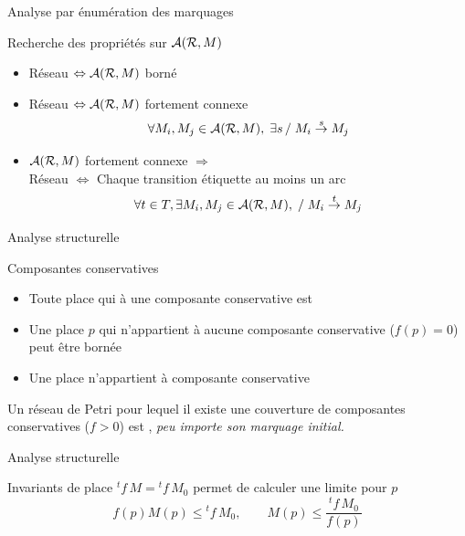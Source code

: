\documentclass[compress]{beamer}
\begin{document}
\begin{frame}{Analyse par énumération des marquages}
\begin{block}{Recherche des propriétés sur ${\cal A(R},M)$}
\begin{itemize}
\item Réseau  $\Leftrightarrow {\cal A(R},M)$ borné
\item Réseau  $\Leftrightarrow {\cal A(R},M)$ fortement connexe
$$\forall M_i, M_j \in {\cal A(R},M), \; \exists s \, / \; M_i \stackrel{s}{\rightarrow} M_j$$
\item ${\cal A(R},M)$ fortement connexe $\Rightarrow$\\
Réseau  $\Leftrightarrow$ Chaque transition étiquette au moins un arc
$$\forall t \in T, \exists M_i, M_j \in {\cal A(R},M), \; / \; M_i
\stackrel{t}{\rightarrow} M_j$$
\end{itemize}  
\end{block}
\end{frame}  

 
\begin{frame}{Analyse structurelle}
\begin{block}{Composantes conservatives}
\begin{itemize}
\item Toute place qui  à une composante conservative  est 
\item Une place $p$ qui n'appartient à aucune composante conservative ($f(p)=0$) peut être bornée
\item Une place  n'appartient à  composante conservative
\end{itemize}
Un réseau de Petri pour lequel il existe une couverture de composantes 
conservatives ($f>0$) est , {\it peu importe son marquage initial.}
\end{block}
\end{frame}  
 
\begin{frame}{Analyse structurelle}
\begin{block}{Invariants de place}
${}^tf \, M = {}^tf \, M_0$ permet de calculer une limite pour  $p$
$$f(p) M(p) \leq {}^tf \, M_0, \qquad M(p) \leq \frac{{}^tf \, M_0}{f(p)}$$
\end{block}
\end{frame}  
\end{document}
